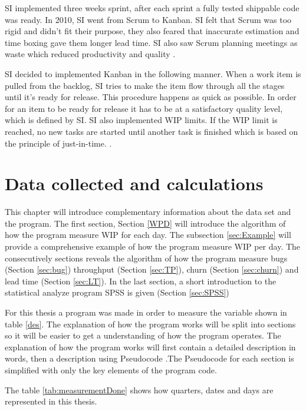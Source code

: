 \documentclass[UKenglish]{ifimaster}  %
\begin{document}
SI implemented three weeks sprint, after each sprint a fully tested shippable code was ready. In 2010, SI went from Scrum to Kanban. SI felt that Scrum was too rigid and didn't fit their purpose, they also feared that inaccurate estimation and time boxing gave them longer lead time. SI also saw Scrum planning meetings as waste which reduced productivity and quality \parencite{Dag}. 

SI decided to implemented Kanban in the following manner. When a work item is pulled from the backlog, SI tries to make the item flow through all the stages until it's ready for release. This procedure happens as quick as possible. In order for an item to be ready for release it has to be at a satisfactory quality level, which is defined by SI. SI also implemented WIP limits. If the WIP limit is reached, no new tasks are started until another task is finished which is based on the principle of just-in-time. \parencite{Dag}.






\chapter{Data collected and calculations}
\label{ch:DCC}
This chapter will introduce complementary information about the data set and the program. The first section, Section \ref{WPD} will introduce the algorithm of how the program measure WIP for each day. The subsection \ref{sec:Example} will provide a comprehensive example of how the program measure WIP per day. The consecutively sections reveals the algorithm of how the program measure bugs (Section \ref{sec:bug}) throughput (Section \ref{sec:TP}),  churn (Section \ref{sec:churn}) and lead time (Section \ref{sec:LT}). In the last section, a short introduction to the statistical analyze program SPSS is given (Section \ref{sec:SPSS})

For this thesis a program was made in order to measure the variable shown in table \ref{des}. The explanation of how the program works will be split into sections so it will be easier to get a understanding of how the program operates. The explanation of how the program works will first contain a detailed description in words, then a description using Pseudocode \parencite{jd}.The Pseudocode for each section is simplified with only the key elements of the program code. 


The table \ref{tab:measurementDone} shows how quarters, dates and days are represented in this thesis. 
\end{document}
